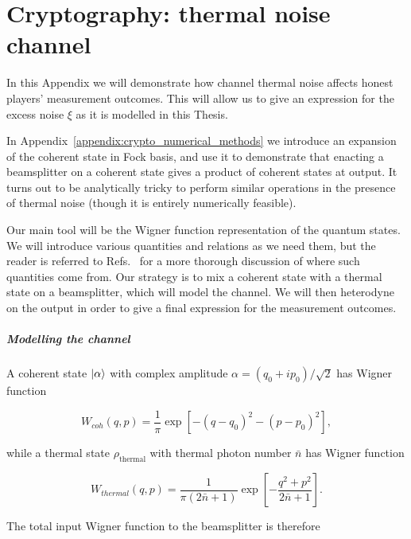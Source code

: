 \chapter{Cryptography: thermal noise channel}\label{appendix:noisy_perr}

In this Appendix we will demonstrate how channel thermal noise affects honest players' measurement outcomes. This will allow us to give an expression for the excess noise $\xi$ as it is modelled in this Thesis.

In Appendix~\ref{appendix:crypto_numerical_methods} we introduce an expansion of the coherent state in Fock basis, and use it to demonstrate that enacting a beamsplitter on a coherent state gives a product of coherent states at output. It turns out to be analytically tricky to perform similar operations in the presence of thermal noise (though it is entirely numerically feasible). 

Our main tool will be the Wigner function representation of the quantum states. We will introduce various quantities and relations as we need them, but the reader is referred to Refs.~\cite{Leonhardt2010, Serafini2017, brendon_book} for a more thorough discussion of where such quantities come from. Our strategy is to mix a coherent state with a thermal state on a beamsplitter, which will model the channel. We will then heterodyne on the output in order to give a final expression for the measurement outcomes.


\paragraph{Modelling the channel}

A coherent state $\ket{\alpha}$ with complex amplitude $\alpha = \left(q_0 + i p_0\right)/\sqrt{2}$ has Wigner function

\begin{equation}
W_{coh}\left(q, p\right) = \frac{1}{\pi} \exp\left[- \left(q - q_0\right)^2 - \left(p - p_0\right)^2 \right],
\end{equation}

\noindent while a thermal state $\rho_{\text{thermal}}$ with thermal photon number $\bar{n}$ has Wigner function

\begin{equation}
W_{thermal}\left(q, p\right) = \frac{1}{\pi\left(2 \bar{n} + 1 \right)}\exp\left[- \frac{q^2 + p^2}{2 \bar{n} + 1} \right].
\end{equation}

\noindent The total input Wigner function to the beamsplitter is therefore

